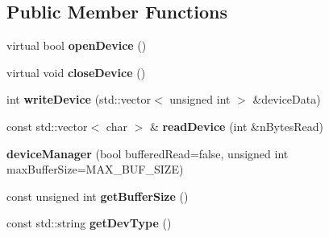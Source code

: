 \subsection*{Public Member Functions}
\begin{DoxyCompactItemize}
\item 
\hypertarget{classdeviceManager_ad3fd308a8add5e51c1c145896bc2daf9}{virtual bool {\bfseries open\-Device} ()}\label{classdeviceManager_ad3fd308a8add5e51c1c145896bc2daf9}

\item 
\hypertarget{classdeviceManager_ae643291e5d1732bfe72032ea62c5253b}{virtual void {\bfseries close\-Device} ()}\label{classdeviceManager_ae643291e5d1732bfe72032ea62c5253b}

\item 
\hypertarget{classdeviceManager_a368b612f7207d4777351fbb58ae92682}{int {\bfseries write\-Device} (std\-::vector$<$ unsigned int $>$ \&device\-Data)}\label{classdeviceManager_a368b612f7207d4777351fbb58ae92682}

\item 
\hypertarget{classdeviceManager_abb8987142dce5d83c05773576a643f50}{const std\-::vector$<$ char $>$ \& {\bfseries read\-Device} (int \&n\-Bytes\-Read)}\label{classdeviceManager_abb8987142dce5d83c05773576a643f50}

\item 
\hypertarget{classdeviceManager_a1cbcde6f497b8472b873e739f75e92e4}{{\bfseries device\-Manager} (bool buffered\-Read=false, unsigned int max\-Buffer\-Size=M\-A\-X\-\_\-\-B\-U\-F\-\_\-\-S\-I\-Z\-E)}\label{classdeviceManager_a1cbcde6f497b8472b873e739f75e92e4}

\item 
\hypertarget{classdeviceManager_a16183255591219aaf6986997a486ff6a}{const unsigned int {\bfseries get\-Buffer\-Size} ()}\label{classdeviceManager_a16183255591219aaf6986997a486ff6a}

\item 
\hypertarget{classdeviceManager_a5e0e8c642ce32a7e7a435a8cbc563576}{const std\-::string {\bfseries get\-Dev\-Type} ()}\label{classdeviceManager_a5e0e8c642ce32a7e7a435a8cbc563576}

\end{DoxyCompactItemize}
